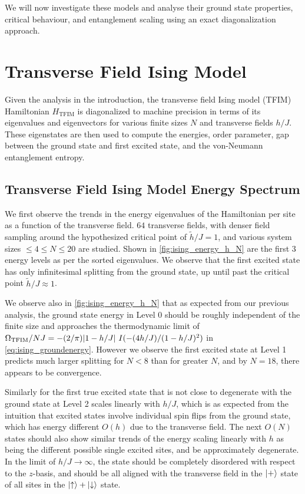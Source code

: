 \documentclass[12pt]{article}{}
\begin{document}
We will now investigate these models and analyse their ground state properties, critical behaviour, and entanglement scaling using an exact diagonalization approach.


\newpage
\section{Transverse Field Ising Model}
Given the analysis in the introduction, the transverse field Ising model (TFIM) Hamiltonian $H_{\textrm{TFIM}}$ is diagonalized to machine precision in terms of its eigenvalues and eigenvectors for various finite sizes $N$ and transverse fields $h/J$. These eigenstates are then used to compute the energies, order parameter, gap between the ground state and first excited state, and the von-Neumann entanglement entropy.

\subsection{Transverse Field Ising Model Energy Spectrum}
We first observe the trends in the energy eigenvalues of the Hamiltonian per site as a function of the transverse field. $64$ transverse fields, with denser field sampling around the hypothesized critical point of $\tilde{h}/J = 1$, and various system sizes $\leq 4 \leq N \leq 20$ are studied. Shown in \cref{fig:ising_energy_h_N} are the first $3$ energy levels as per the sorted eigenvalues. We observe that the first excited state has only infinitesimal splitting from the ground state, up until past the critical point $\tilde{h}/J \approx 1$. 

We observe also in \cref{fig:ising_energy_h_N} that as expected from our previous analysis, the ground state energy in Level 0 should be roughly independent of the finite size and approaches the thermodynamic limit of $\Omega_{\textrm{TFIM}}/{NJ} = -(2/\pi)\abs{1-h/J}~I(-(4h/J)/(1-h/J)^2)$ in  \cref{eq:ising_groundenergy}. However we observe the first excited state at Level 1 predicts much larger splitting for $N<8$ than for greater $N$, and by $N = 18$, there appears to be convergence. 

Similarly for the first true excited state that is not close to degenerate with the ground state at Level 2 scales linearly with $h/J$, which is as expected from the intuition that excited states involve individual spin flips from the ground state, which has energy different $O(h)$ due to the transverse field. The next $O(N)$ states should also show similar trends of the energy scaling linearly with $h$ as being the different possible single excited sites, and be approximately degenerate. In the limit of $h/J \to \infty$, the state should be completely disordered with respect to the $z$-basis, and should be all aligned with the transverse field in the $\ket{+}$ state of all sites in the $\ket{\uparrow} + \ket{\downarrow}$ state.
\end{document}
